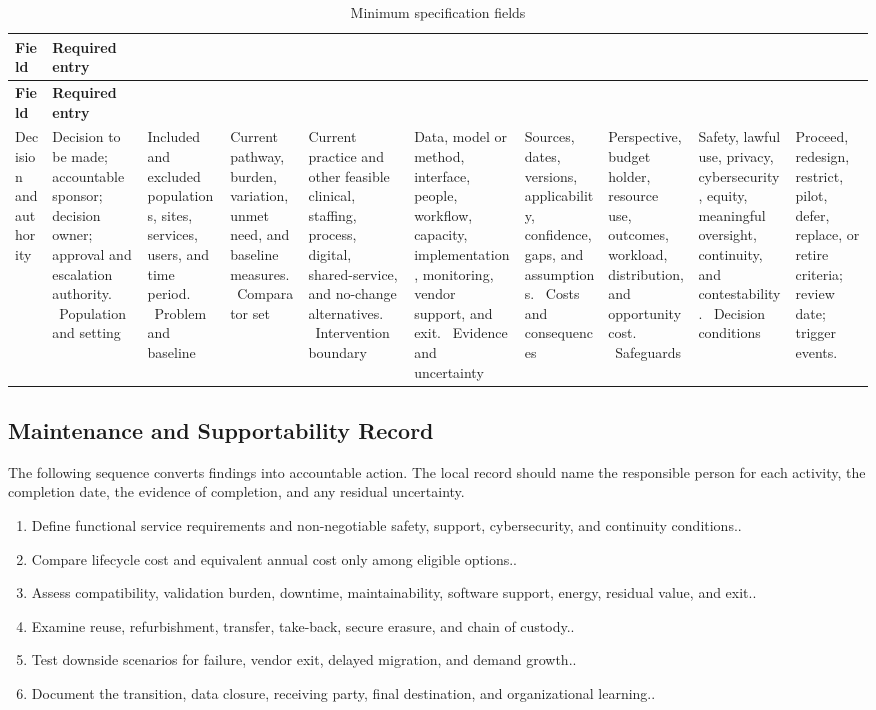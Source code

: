 \begin{longtable}{@{}p{}p{}@{}}
\caption{Minimum specification fields}
\label{tab:comp-ch14-spec-fields}\\
\toprule
\textbf{Field} & \textbf{Required entry} \\
\midrule
\endfirsthead
\toprule
\textbf{Field} & \textbf{Required entry} \\
\midrule
\endhead
\bottomrule
\endlastfoot
Decision and authority & Decision to be made; accountable sponsor; decision owner; approval and escalation authority. \
Population and setting & Included and excluded populations, sites, services, users, and time period. \
Problem and baseline & Current pathway, burden, variation, unmet need, and baseline measures. \
Comparator set & Current practice and other feasible clinical, staffing, process, digital, shared-service, and no-change alternatives. \
Intervention boundary & Data, model or method, interface, people, workflow, capacity, implementation, monitoring, vendor support, and exit. \
Evidence and uncertainty & Sources, dates, versions, applicability, confidence, gaps, and assumptions. \
Costs and consequences & Perspective, budget holder, resource use, outcomes, workload, distribution, and opportunity cost. \
Safeguards & Safety, lawful use, privacy, cybersecurity, equity, meaningful oversight, continuity, and contestability. \
Decision conditions & Proceed, redesign, restrict, pilot, defer, replace, or retire criteria; review date; trigger events. \
\end{longtable}

\subsection{Maintenance and Supportability Record}
\label{sec:comp-ch14-supp-2}
The following sequence converts findings into accountable action. The local record
should name the responsible person for each activity, the completion date, the
evidence of completion, and any residual uncertainty.

\begin{enumerate}
 \item Define functional service requirements and non-negotiable safety, support, cybersecurity, and continuity conditions..
 \item Compare lifecycle cost and equivalent annual cost only among eligible options..
 \item Assess compatibility, validation burden, downtime, maintainability, software support, energy, residual value, and exit..
 \item Examine reuse, refurbishment, transfer, take-back, secure erasure, and chain of custody..
 \item Test downside scenarios for failure, vendor exit, delayed migration, and demand growth..
 \item Document the transition, data closure, receiving party, final destination, and organizational learning..
\end{enumerate}

